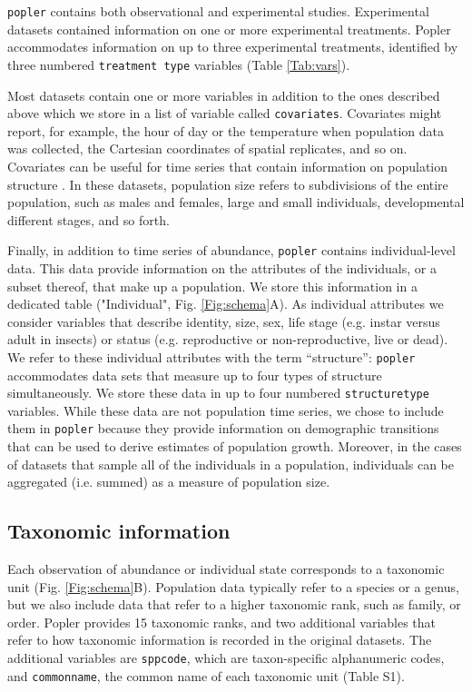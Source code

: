 \documentclass{article}\usepackage[]{graphicx}\usepackage[]{color}
\newcommand{\tom}[1]{{\textit{\color{red}{[#1]}}}}
\begin{document}
\texttt{popler} contains both observational and experimental studies. Experimental datasets contained information on one or more experimental treatments. Popler accommodates information on up to three experimental treatments, identified by three numbered \texttt{treatment type} variables (Table \ref{Tab:vars}). 

Most datasets contain one or more variables in addition to the ones described above which we store in a list of variable called \texttt{covariates}. Covariates might report, for example, the hour of day or the temperature when population data was collected, the Cartesian coordinates of spatial replicates, and so on. Covariates can be useful for time series that contain information on population structure \tom{Would this be indicated in the metadata? How would someone search for such studies or know if they are working with one?}. In these datasets, population size refers to subdivisions of the entire population, such as males and females, large and small individuals, developmental different stages, and so forth.

Finally, in addition to time series of abundance, \texttt{popler} contains individual-level data. This data provide information on the attributes of the individuals, or a subset thereof, that make up a population. We store this information in a dedicated table ("Individual", Fig. \ref{Fig:schema}A). As individual attributes we consider variables that describe identity, size, sex, life stage (e.g. instar versus adult in insects) or status (e.g. reproductive or non-reproductive, live or dead). We refer to these individual attributes with the term ``structure'': \texttt{popler} accommodates data sets that measure up to four types of structure simultaneously. We store these data in up to four numbered \texttt{structure\textunderscore type} variables. While these data are not population time series, we chose to include them in \texttt{popler} because they provide information on demographic transitions that can be used to derive estimates of population growth. Moreover, in the cases of datasets that sample all of the individuals in a population, individuals can be aggregated (i.e. summed) as a measure of population size.

\subsection*{Taxonomic information}
Each observation of abundance or individual state corresponds to a taxonomic unit (Fig. \ref{Fig:schema}B). Population data typically refer to a species or a genus, but we also include data that refer to a higher taxonomic rank, such as family, or order. %
Popler provides 15 taxonomic ranks, and two additional variables that refer to how taxonomic information is recorded in the original datasets. The additional variables are \texttt{sppcode}, which are taxon-specific alphanumeric codes, and \texttt{common\textunderscore name}, the common name of each taxonomic unit (Table S1).
\end{document}
